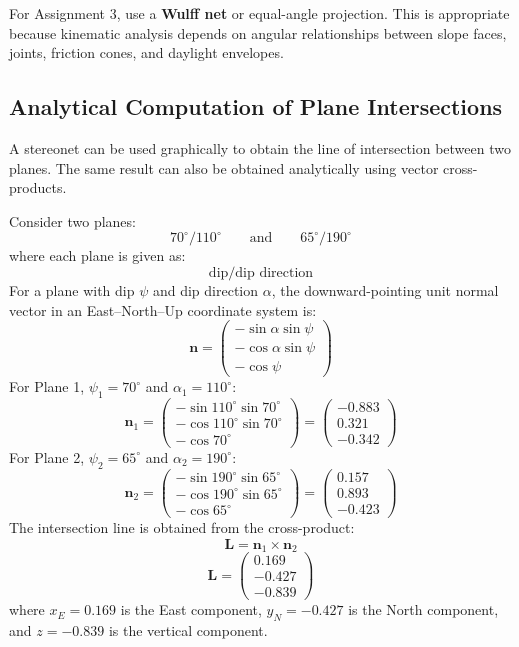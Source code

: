\documentclass[a4paper,12pt]{article}
\begin{document}
\begin{notebox}
For Assignment 3, use a \textbf{Wulff net} or equal-angle projection. This is appropriate because kinematic analysis depends on angular relationships between slope faces, joints, friction cones, and daylight envelopes.
\end{notebox}

\subsection{Analytical Computation of Plane Intersections}
A stereonet can be used graphically to obtain the line of intersection between two planes. The same result can also be obtained analytically using vector cross-products.
\begin{calcbox}
Consider two planes:
\[
70^\circ/110^\circ
\qquad \text{and} \qquad
65^\circ/190^\circ
\]
where each plane is given as:
\[
\text{dip}/\text{dip direction}
\]
For a plane with dip $\psi$ and dip direction $\alpha$, the downward-pointing unit normal vector in an East--North--Up coordinate system is:
\[
\mathbf{n} =
\begin{pmatrix}
-\sin\alpha \sin\psi \\
-\cos\alpha \sin\psi \\
-\cos\psi
\end{pmatrix}
\]
For Plane 1, $\psi_1=70^\circ$ and $\alpha_1=110^\circ$:
\[
\mathbf{n}_1 =
\begin{pmatrix}
-\sin110^\circ \sin70^\circ \\
-\cos110^\circ \sin70^\circ \\
-\cos70^\circ
\end{pmatrix}
=
\begin{pmatrix}
-0.883\\
0.321\\
-0.342
\end{pmatrix}
\]
For Plane 2, $\psi_2=65^\circ$ and $\alpha_2=190^\circ$:
\[
\mathbf{n}_2 =
\begin{pmatrix}
-\sin190^\circ \sin65^\circ \\
-\cos190^\circ \sin65^\circ \\
-\cos65^\circ
\end{pmatrix}
=
\begin{pmatrix}
0.157\\
0.893\\
-0.423
\end{pmatrix}
\]
The intersection line is obtained from the cross-product:
\[
\mathbf{L} = \mathbf{n}_1 \times \mathbf{n}_2
\]
\[
\mathbf{L}
=
\begin{pmatrix}
0.169\\
-0.427\\
-0.839
\end{pmatrix}
\]
where $x_E=0.169$ is the East component, $y_N=-0.427$ is the North component, and $z=-0.839$ is the vertical component.
\end{calcbox}
\end{document}
